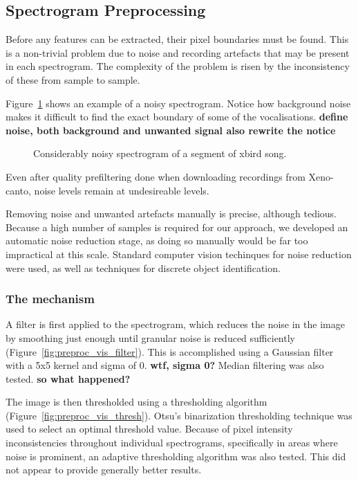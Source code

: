 \subsection{Spectrogram Preprocessing}\label{sec:preproc}

Before any features can be extracted, their pixel boundaries must be found.
This is a non-trivial problem due to noise and recording artefacts
that may be present in each spectrogram.
The complexity of the problem is risen by the inconsistency of these from sample
to sample.

Figure~\ref{fig:sgram_noise} shows an example of a noisy spectrogram.
Notice how background noise makes it difficult to find the exact boundary of
some of the vocalisations.
\textbf{define noise, both background and unwanted signal also rewrite the notice}

\begin{figure}[h]
  \centering

  \caption{Considerably noisy spectrogram of a segment of xbird song.}
  \label{fig:sgram_noise}
\end{figure}

Even after quality prefiltering done when downloading recordings from
Xeno-canto, noise levels remain at undesireable levels.

Removing noise and unwanted artefacts manually is precise, although tedious.
Because a high number of samples is required for our approach, we developed an
automatic noise reduction stage, as doing so manually would be far too
impractical at this scale.
Standard computer vision techinques for noise reduction were used, as well as
techniques for discrete object identification.

\subsubsection{The mechanism}
A filter is first applied to the spectrogram, which reduces the noise in the
image by smoothing just enough until granular noise is reduced sufficiently
(Figure~\ref{fig:preproc_vis_filter}).
This is accomplished using a Gaussian filter with a 5x5 kernel and sigma of 0.
\textbf{wtf, sigma 0?}
Median filtering was also tested. \textbf{so what happened?}

The image is then thresholded using a thresholding algorithm
(Figure~\ref{fig:preproc_vis_thresh}).
Otsu's binarization thresholding technique was used to select an optimal
threshold value.
Because of pixel intensity inconsistencies throughout individual spectrograms,
specifically in areas where noise is prominent, an adaptive thresholding
algorithm was also tested.
This did not appear to provide generally better results.


